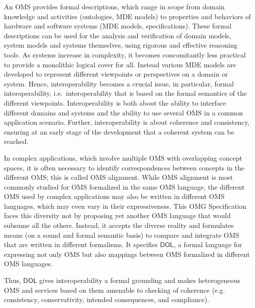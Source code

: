 \documentclass[10pt, a4paper]{isov2}
\makeatletter
\newcommand*{\eg}{e.g.\@\xspace}
\newcommand*{\IS}{OMG Specification\xspace}
\newcommand*{\DOL}{\ensuremath{\mathsf{DOL}}\xspace}
\makeatother
\begin{document}
An OMS provides formal descriptions, which range in scope from domain knowledge and activities
(ontologies, MDE models) to properties and behaviors of hardware and software systems (MDE models,
specifications). These formal descriptions can be used for the analysis and verification of domain
models, system models and systems themselves, using rigorous and effective reasoning tools.   As 
systems increase in complexity, it becomes concomitantly less practical to provide a monolithic 
logical cover for all.  Instead various MDE models are developed to represent different viewpoints or 
perspectives on a domain or system. 
 Hence, interoperability becomes
a crucial issue, in particular, formal interoperability, i.e.\ interoperability that is based on
the formal semantics of the different viewpoints. Interoperability is both about the ability to 
interface different domains and systems and the ability to use several OMS in a common application
scenario. Further,  interoperability is about coherence and consistency, ensuring at an early stage of the development
that a coherent system can be reached.


In complex applications, which involve multiple OMS with overlapping concept spaces,
it is often necessary to identify correspondences between concepts in the different OMS; this is called  OMS alignment. 
While OMS alignment is most commonly studied for OMS formalized in the same OMS 
language, the different OMS used by complex applications may also be written in different 
OMS languages, which may even vary in their expressiveness. 
This \IS faces this diversity not by proposing yet another OMS language that would subsume all the others.  
Instead, it accepts the diverse reality and formulates means (on a sound and formal semantic basis) 
to compare and integrate OMS that are written in different formalisms.
It specifies \DOL, a formal language for
expressing not only OMS but also mappings between OMS formalized in different OMS languages.

Thus, \DOL gives interoperability a formal grounding and makes heterogeneous OMS and services based
on them amenable to checking of coherence (\eg consistency, conservativity, intended consequences,
and compliance).


\end{document}
